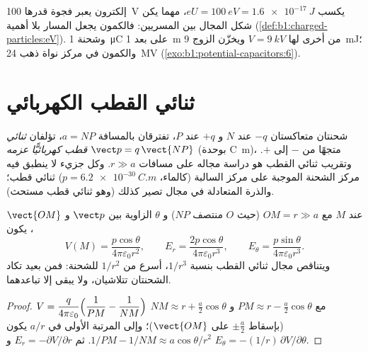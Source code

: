 \begin{example}\label{ex:b1:potential-capacitors:eV}
إلكترون يعبر فجوة قدرها \qty{100}{V} يكسب $eU = \qty{100}{eV} =
\qty{1.6e-17}{J}$، مهما يكن شكل المجال بين
المسريين: فالكمون يجعل المسار بلا أهمية
(\cref{def:b1:charged-particles:eV}). وشحنة \qty{1}{\micro C} على بعد
\qty{1}{m} من أخرى لها $V = \qty{9}{kV}$ ويخزّن الزوج
\qty{9}{mJ}؛ والكمون في مركز نواة ذهب
\qty{24}{MV} (\cref{exo:b1:potential-capacitors:6}).
\end{example}

\section{ثنائي القطب الكهربائي}

\begin{definition}\label{def:b1:potential-capacitors:dipole}
شحنتان متعاكستان $-q$ عند $N$ و $+q$ عند $P$، تفترقان بالمسافة $a = NP$،
تؤلفان \emph{ثنائي قطب كهربائيًّا} \emph{عزمه}
$\vect p = q\,\vect{NP}$ (بوحدة \unit{C.m})، متجهًا من $-$ إلى $+$. وتقريب
ثنائي القطب هو دراسة مجاله على مسافات $r \gg a$. وكل
جزيء لا ينطبق فيه مركز الشحنة الموجبة على مركز السالبة
(كالماء، $p = \qty{6.2e-30}{C.m}$) ثنائي قطب؛ والذرة المتعادلة في مجال
تصير كذلك (وهو ثنائي قطب مستحث).
\end{definition}

\begin{proposition}\label{prop:b1:potential-capacitors:dipolefield}
عند $M$ مع $OM = r \gg a$ (حيث $O$ منتصف $NP$) و $\theta$
الزاوية بين $\vect p$ و $\vect{OM}$، يكون
\[
V(M) = \frac{p\cos\theta}{4\pi\varepsilon_0 r^2}, \qquad
E_r = \frac{2p\cos\theta}{4\pi\varepsilon_0r^3}, \qquad
E_\theta = \frac{p\sin\theta}{4\pi\varepsilon_0r^3} .
\]
ويتناقص مجال ثنائي القطب بنسبة $1/r^3$، أسرع من $1/r^2$
للشحنة: فمن بعيد تكاد الشحنتان تتلاشيان، ولا يبقى إلا
تباعدهما.
\end{proposition}

\begin{proof}
$V = \dfrac{q}{4\pi\varepsilon_0}\Bigl(\dfrac1{PM} - \dfrac1{NM}\Bigr)$ مع
$PM \approx r - \tfrac a2\cos\theta$ و $NM \approx r + \tfrac a2\cos\theta$
(بإسقاط $\pm\tfrac a2$ على $\vect{OM}$)؛ وإلى المرتبة الأولى في $a/r$ يكون
$1/PM - 1/NM \approx a\cos\theta/r^2$. ثم $E_r = -\partial V/\partial r$ و
$E_\theta = -(1/r)\,\partial V/\partial\theta$.
\end{proof}

